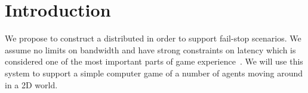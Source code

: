 
\section{Introduction}
\label{sec:Intro}


We propose to construct a distributed \clientServer in order to support fail-stop scenarios. We assume no limits on bandwidth and have strong constraints on latency which is considered one of the most important parts of game experience~\cite{Claypool:2006:LPA:1167838.1167860}. We will use this system to support a simple computer game of a number of agents moving around in a 2D world.

	

